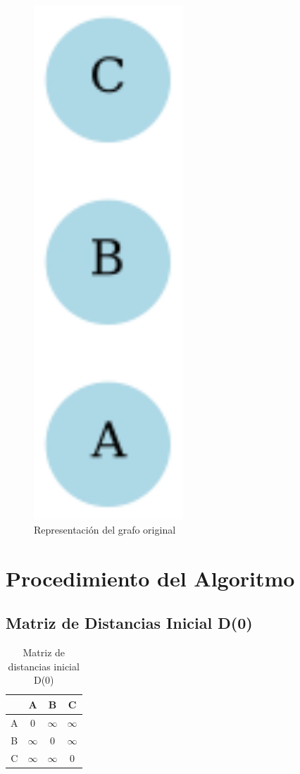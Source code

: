 \documentclass[12pt]{article}
\begin{document}
\begin{figure}[h!]
\centering
\includegraphics[width=0.5\textwidth,keepaspectratio]{grafo.png}
\caption{Representación del grafo original}
\end{figure}

\clearpage
\section{Procedimiento del Algoritmo}
\subsection{Matriz de Distancias Inicial D(0)}
\begin{table}[h!]
\centering
\begin{tabular}{|c|c|c|c|}
\hline
 & A & B & C \\\hline
A & 0 & $\infty$ & $\infty$ \\\hline
B & $\infty$ & 0 & $\infty$ \\\hline
C & $\infty$ & $\infty$ & 0 \\\hline
\end{tabular}
\caption{Matriz de distancias inicial D(0)}
\end{table}
\end{document}
